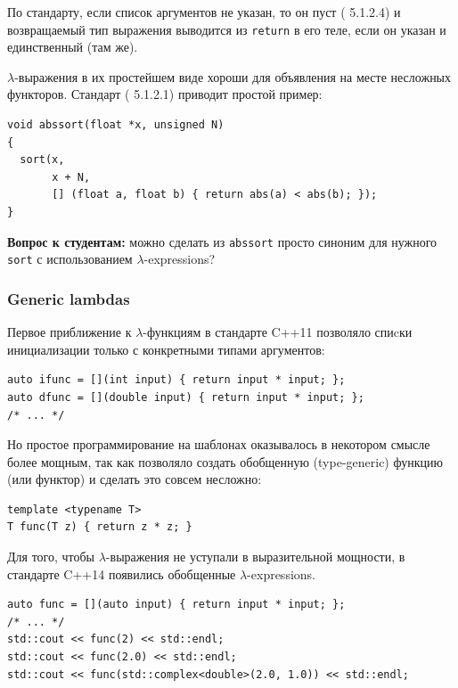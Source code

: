 \documentclass[a4paper,12pt,oneside]{article}
\newif\ifanswers
\begin{document}
По стандарту, если список аргументов не указан, то он пуст (\cite{stdcpp14} 5.1.2.4) и возвращаемый тип выражения выводится из \lstinline!return! в его теле, если он указан и единственный (там же).

$\lambda$-выражения в их простейшем виде хороши для объявления на месте несложных функторов. Стандарт (\cite{stdcpp14} 5.1.2.1) приводит простой пример:

\begin{lstlisting}
void abssort(float *x, unsigned N)
{
  sort(x, 
       x + N,
       [] (float a, float b) { return abs(a) < abs(b); });
}
\end{lstlisting}

\textbf{Вопрос к студентам:} можно сделать из \lstinline!abssort! просто синоним для нужного \lstinline!sort! с использованием $\lambda$-expressions?

\ifanswers
Правильный ответ: конечно и несложно \lstinline!auto abssort = [] (float *x, unsigned N) { /* ... */ }! тело то же самое
\fi

\subsubsection{Generic lambdas}\label{GenericLambdas}

Первое приближение к $\lambda$-функциям в стандарте C++11 позволяло спиcки инициализации только с конкретными типами аргументов:

\begin{lstlisting}
auto ifunc = [](int input) { return input * input; };
auto dfunc = [](double input) { return input * input; };
/* ... */
\end{lstlisting}

Но простое программирование на шаблонах оказывалось в некотором смысле более мощным, так как позволяло создать обобщенную (type-generic) функцию (или функтор) и сделать это совсем несложно:

\begin{lstlisting}
template <typename T>
T func(T z) { return z * z; }
\end{lstlisting}

Для того, чтобы $\lambda$-выражения не уступали в выразительной мощности, в стандарте C++14 появились обобщенные $\lambda$-expressions.

\begin{lstlisting}
auto func = [](auto input) { return input * input; };
/* ... */
std::cout << func(2) << std::endl;
std::cout << func(2.0) << std::endl;
std::cout << func(std::complex<double>(2.0, 1.0)) << std::endl;
\end{lstlisting}
\end{document}
